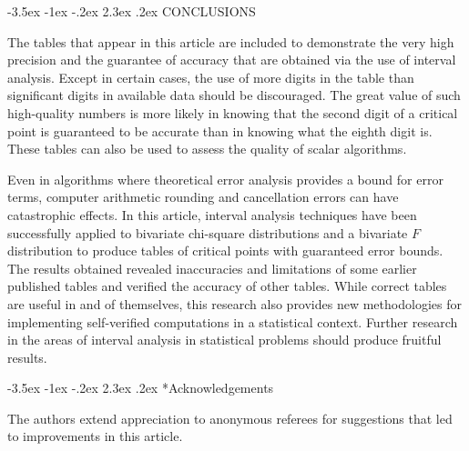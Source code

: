 \documentclass[10pt,letterpaper]{article}
\makeatletter
\renewcommand\section{\@startsection {section}{1}{\z@}%
                 {-3.5ex \@plus -1ex \@minus -.2ex}%
                 {2.3ex \@plus.2ex}%
                 {\normalfont\normalsize\bfseries }}
\makeatother
\begin{document}
\section{CONCLUSIONS\label{sec:conclusions}}

The tables that appear in this article are included to demonstrate the very
high precision and the guarantee of accuracy that are obtained via the use of
interval analysis.  Except in certain cases, 
the use of more digits in the table
than significant digits in available data should be discouraged.  The great
value of such high-quality numbers is more likely in knowing
that the second
digit of a critical point is guaranteed to be accurate than
in knowing what the eighth digit is.  These tables can also be used to assess
the quality of scalar algorithms.

Even in algorithms where theoretical error analysis provides a bound
for error terms,
computer arithmetic rounding and cancellation errors can have catastrophic
effects.  In this article, interval analysis techniques have been successfully
applied to bivariate chi-square distributions and a bivariate $F$ distribution
to produce tables of critical points with guaranteed error bounds.  The
results obtained revealed inaccuracies and limitations of some earlier 
published tables and verified the accuracy of other tables.  
While correct tables are useful in and of themselves,
this research also provides new methodologies for implementing self-verified
computations in a statistical context.  Further research in the areas of
interval analysis in statistical problems should produce fruitful
results.

\section*{Acknowledgements}

The authors extend appreciation to anonymous referees for suggestions 
that led to improvements in this article.
\end{document}
